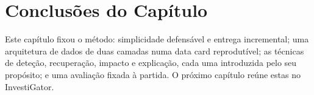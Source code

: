 \section{Conclusões do Capítulo}
\label{sec:met_summary}

Este capítulo fixou o método: simplicidade defensável e entrega incremental; uma arquitetura de dados de
duas camadas numa data card reprodutível; as técnicas de deteção, recuperação, impacto e explicação, cada
uma introduzida pelo seu propósito; e uma avaliação fixada à partida. O próximo capítulo reúne estas no
InvestiGator.
